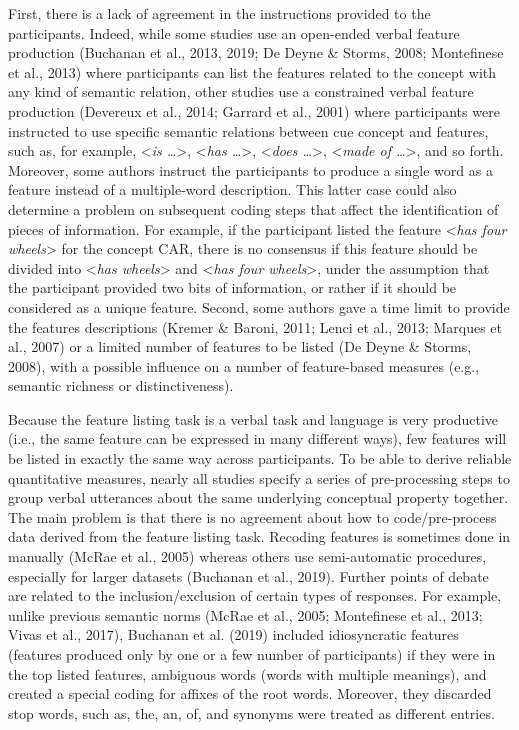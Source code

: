 \documentclass[man]{apa6}
\begin{document}
First, there is a lack of agreement in the instructions provided to the participants. Indeed, while some studies use an open-ended verbal feature production (Buchanan et al., 2013, 2019; De Deyne \& Storms, 2008; Montefinese et al., 2013) where participants can list the features related to the concept with any kind of semantic relation, other studies use a constrained verbal feature production (Devereux et al., 2014; Garrard et al., 2001) where participants were instructed to use specific semantic relations between cue concept and features, such as, for example, \textless{}\emph{is \ldots{}}\textgreater{}, \textless{}\emph{has \ldots{}}\textgreater{}, \textless{}\emph{does \ldots{}}\textgreater{}, \textless{}\emph{made of \ldots{}}\textgreater{}, and so forth. Moreover, some authors instruct the participants to produce a single word as a feature instead of a multiple-word description. This latter case could also determine a problem on subsequent coding steps that affect the identification of pieces of information. For example, if the participant listed the feature \textless{}\emph{has four wheels}\textgreater{} for the concept CAR, there is no consensus if this feature should be divided into \textless{}\emph{has wheels}\textgreater{} and \textless{}\emph{has four wheels}\textgreater{}, under the assumption that the participant provided two bits of information, or rather if it should be considered as a unique feature. Second, some authors gave a time limit to provide the features descriptions (Kremer \& Baroni, 2011; Lenci et al., 2013; Marques et al., 2007) or a limited number of features to be listed (De Deyne \& Storms, 2008), with a possible influence on a number of feature-based measures (e.g., semantic richness or distinctiveness).

Because the feature listing task is a verbal task and language is very productive (i.e., the same feature can be expressed in many different ways), few features will be listed in exactly the same way across participants. To be able to derive reliable quantitative measures, nearly all studies specify a series of pre-processing steps to group verbal utterances about the same underlying conceptual property together. The main problem is that there is no agreement about how to code/pre-process data derived from the feature listing task. Recoding features is sometimes done in manually (McRae et al., 2005) whereas others use semi-automatic procedures, especially for larger datasets (Buchanan et al., 2019). Further points of debate are related to the inclusion/exclusion of certain types of responses. For example, unlike previous semantic norms (McRae et al., 2005; Montefinese et al., 2013; Vivas et al., 2017), Buchanan et al. (2019) included idiosyncratic features (features produced only by one or a few number of participants) if they were in the top listed features, ambiguous words (words with multiple meanings), and created a special coding for affixes of the root words. Moreover, they discarded stop words, such as, the, an, of, and synonyms were treated as different entries.
\end{document}
